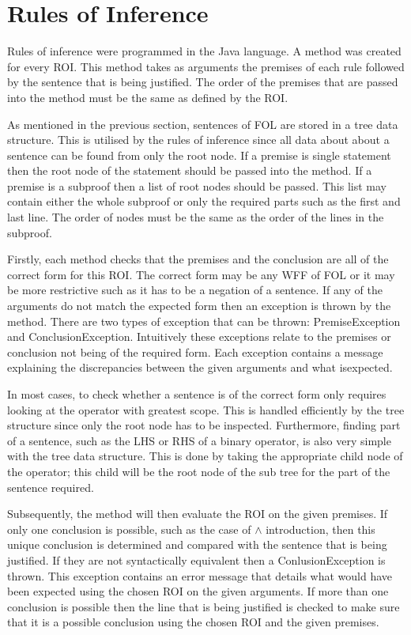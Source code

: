 \FloatBarrier


\section{Rules of Inference}

Rules of inference were programmed in the Java language. A method was created for every ROI. This method takes as arguments the premises of each rule followed by the sentence that is being justified. The order of the premises that are passed into the method must be the same as defined by the ROI. 

As mentioned in the previous section, sentences of FOL are stored in a tree data structure. This is utilised by the rules of inference since all data about about a sentence can be found from only the root node. If a premise is single statement then the root node of the statement should be passed into the method. If a premise is a subproof then a list of root nodes should be passed. This list may contain either the whole subproof or only the required parts such as the first and last line. The order of nodes must be the same as the order of the lines in the subproof.  

Firstly, each method checks that the premises and the conclusion are all of the correct form for this ROI. The correct form may be any WFF of FOL or it may be more restrictive such as it has to be a negation of a sentence. If any of the arguments do not match the expected form then an exception is thrown by the method. There are two types of exception that can be thrown: PremiseException and ConclusionException. Intuitively these exceptions relate to the premises or conclusion not being of the required form. Each exception contains a message explaining the discrepancies between the given arguments and what isexpected.

In most cases, to check whether a sentence is of the correct form only requires looking at the operator with greatest scope. This is handled efficiently by the tree structure since only the root node has to be inspected. Furthermore, finding part of a sentence, such as the LHS  or RHS of a binary operator, is also very simple with the tree data structure. This is done by taking the appropriate child node of the operator; this child will be the root node of the sub tree for the part of the sentence required.

Subsequently, the method will then evaluate the ROI on the given premises. If only one conclusion is possible, such as the case of $\land$ introduction, then this unique conclusion is determined and compared with the sentence that is being justified. If they are not syntactically equivalent then a ConlusionException is thrown. This exception contains an error message that details what would have been expected using the chosen ROI on the given arguments. If more than one conclusion is possible then the line that is being justified is checked to make sure that it is a possible conclusion using the chosen ROI and the given premises.


